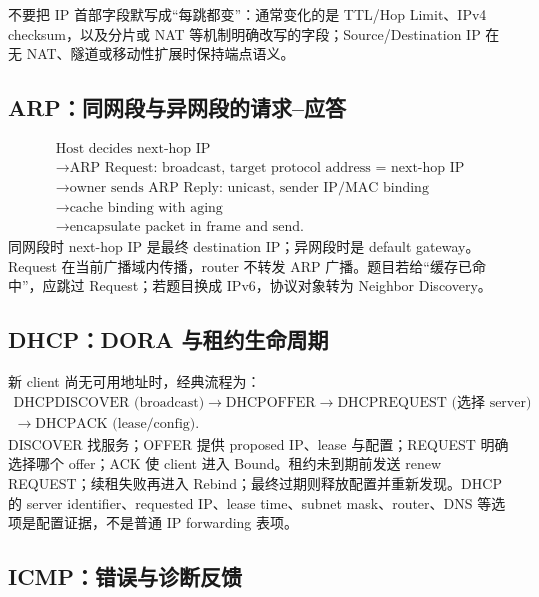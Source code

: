 \documentclass[11pt,a4paper]{ctexart}
\begin{document}
不要把 IP 首部字段默写成“每跳都变”：通常变化的是 TTL/Hop Limit、IPv4 checksum，以及分片或 NAT 等机制明确改写的字段；Source/Destination IP 在无 NAT、隧道或移动性扩展时保持端点语义。

\subsection{ARP：同网段与异网段的请求--应答}

\[
\begin{array}{l}
\text{Host decides next-hop IP}\\
\to\text{ARP Request: broadcast, target protocol address = next-hop IP}\\
\to\text{owner sends ARP Reply: unicast, sender IP/MAC binding}\\
\to\text{cache binding with aging}\\
\to\text{encapsulate packet in frame and send.}
\end{array}
\]
同网段时 next-hop IP 是最终 destination IP；异网段时是 default gateway。Request 在当前广播域内传播，router 不转发 ARP 广播。题目若给“缓存已命中”，应跳过 Request；若题目换成 IPv6，协议对象转为 Neighbor Discovery。

\subsection{DHCP：DORA 与租约生命周期}

新 client 尚无可用地址时，经典流程为：
\[
\begin{gathered}
\text{DHCPDISCOVER (broadcast)}\to\text{DHCPOFFER}\to\text{DHCPREQUEST (选择 server)}\\
\to\text{DHCPACK (lease/config)}.
\end{gathered}
\]
DISCOVER 找服务；OFFER 提供 proposed IP、lease 与配置；REQUEST 明确选择哪个 offer；ACK 使 client 进入 Bound。租约未到期前发送 renew REQUEST；续租失败再进入 Rebind；最终过期则释放配置并重新发现。DHCP 的 server identifier、requested IP、lease time、subnet mask、router、DNS 等选项是配置证据，不是普通 IP forwarding 表项。

\subsection{ICMP：错误与诊断反馈}
\end{document}
